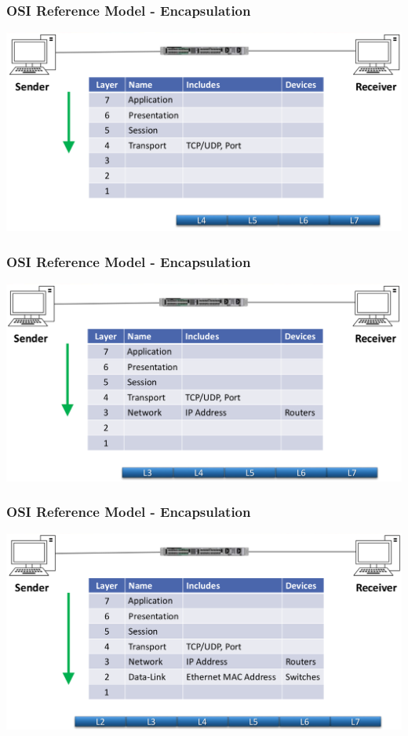 \documentclass[pdflatex,compress]{beamer}
\begin{document}
\begin{frame}
	\frametitle{OSI Reference Model - Encapsulation}
	\begin{center}
		\includegraphics[width=\linewidth]{img/img08}
	\end{center}
\end{frame}

\begin{frame}
	\frametitle{OSI Reference Model - Encapsulation}
	\begin{center}
		\includegraphics[width=\linewidth]{img/img09}
	\end{center}
\end{frame}

\begin{frame}
	\frametitle{OSI Reference Model - Encapsulation}
	\begin{center}
		\includegraphics[width=\linewidth]{img/img10}
	\end{center}
\end{frame}
\end{document}
